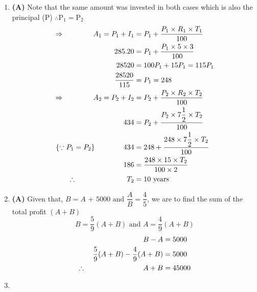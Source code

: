 \begin{multicols}{2}
\begin{enumerate}[label={\arabic*.}]
    \item \textbf{(A)} Note that the same amount was invested in both cases which is also the principal (P) 
    \( \therefore \text{P}_1 = \text{P}_2\)
    \begin{align*} 
        \Rightarrow \hspace{40px} A_1 = P_1 + I_1 &= P_1 + \dfrac{P_1 \times R_1 \times T_1}{100} \\
        285.20&= P_1 + \dfrac{P_1 \times 5 \times 3}{100} \\
         28520 &= 100P_1 + 15P_1 = 115P_1 \\
         \dfrac{28520}{115}&= P_1 = 248 \\
        \Rightarrow \hspace{40px}  A_2 = P_2 + I_2 &= P_2 + \dfrac{P_2 \times R_2 \times T_2}{100} \\
        434&= P_2 + \dfrac{P_2 \times 7\dfrac{1}{2} \times T_2}{100} \\
        \{ \because P_1 = P_2\} \hspace{40px} 434&= 248 + \dfrac{248 \times 7\dfrac{1}{2} \times T_2}{100} \\
        186 &= \dfrac{248 \times 15 \times T_2}{100 \times 2} \\
        \therefore \hspace{70px} T_2 & = 10 \text{ years}
    \end{align*}
    
    \item \textbf{(A) } Given that, \(B = A \text{ + 5000 and } \dfrac{A}{B} = \dfrac{4}{5}\), we are to find the sum 
    of the total profit $\left( A + B\right)$
    \[B = \dfrac{5}{9}(A + B) \text{ and } A = \dfrac{4}{9}(A + B)\]
    \begin{align*}
        B - A &= 5000 \\
        \dfrac{5}{9}(A + B) - \dfrac{4}{9}(A + B) &= 5000 \\
        \therefore \hspace{80px}  A + B &= 45000
    \end{align*}
    
    \item  


\end{enumerate}
\end{multicols}
